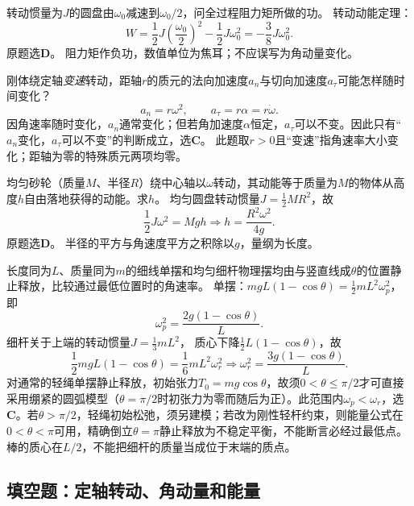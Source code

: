 \problemtext 转动惯量为$J$的圆盘由$\omega_0$减速到$\omega_0/2$，问全过程阻力矩所做的功。
\workings
转动动能定理：
\[
W=\frac12J\left(\frac{\omega_0}{2}\right)^2-\frac12J\omega_0^2
=\boxed{-\frac38J\omega_0^2}.
\]
原题选\textbf{D}。
\crosscheck 阻力矩作负功，数值单位为焦耳；不应误写为角动量变化。

\problemtext 刚体绕定轴\emph{变速}转动，距轴$r$的质元的法向加速度$a_n$与切向加速度$a_\tau$可能怎样随时间变化？
\workings
\[
a_n=r\omega^2,\qquad a_\tau=r\alpha=r\dot\omega.
\]
因角速率随时变化，$a_n$通常变化；但若角加速度$\alpha$恒定，$a_\tau$可以不变。因此只有“$a_n$变化，$a_\tau$可以不变”的判断成立，选\textbf{C}。
\crosscheck 此题取$r>0$且“变速”指角速率大小变化；距轴为零的特殊质元两项均零。

\problemtext 均匀砂轮（质量$M$、半径$R$）绕中心轴以$\omega$转动，其动能等于质量为$M$的物体从高度$h$自由落地获得的动能。求$h$。
\workings
均匀圆盘转动惯量$J=\frac12MR^2$，故
\[
\frac12J\omega^2=Mgh
\Longrightarrow \boxed{h=\frac{R^2\omega^2}{4g}}.
\]
原题选\textbf{D}。
\crosscheck 半径的平方与角速度平方之积除以$g$，量纲为长度。

\problemtext 长度同为$L$、质量同为$m$的细线单摆和均匀细杆物理摆均由与竖直线成$\theta$的位置静止释放，比较通过最低位置时的角速率。
\workings
单摆：$mgL(1-\cos\theta)=\frac12mL^2\omega_p^2$，即
\[
\omega_p^2=\frac{2g(1-\cos\theta)}{L}.
\]
细杆关于上端的转动惯量$J=\frac13mL^2$，
质心下降$\frac12L(1-\cos\theta)$，故
\[
\frac12mgL(1-\cos\theta)=\frac16mL^2\omega_r^2
\Longrightarrow \omega_r^2=\frac{3g(1-\cos\theta)}{L}.
\]
对通常的轻绳单摆静止释放，初始张力$T_0=mg\cos\theta$，故须$0<\theta\le\pi/2$才可直接采用绷紧的圆弧模型（$\theta=\pi/2$时初张力为零而随后为正）。此范围内$\omega_p<\omega_r$，选\textbf{C}。若$\theta>\pi/2$，轻绳初始松弛，须另建模；若改为刚性轻杆约束，则能量公式在$0<\theta<\pi$可用，精确倒立$\theta=\pi$静止释放为不稳定平衡，不能断言必经过最低点。
\crosscheck 棒的质心在$L/2$，不能把细杆的质量当成位于末端的质点。

\subsection{填空题：定轴转动、角动量和能量}

